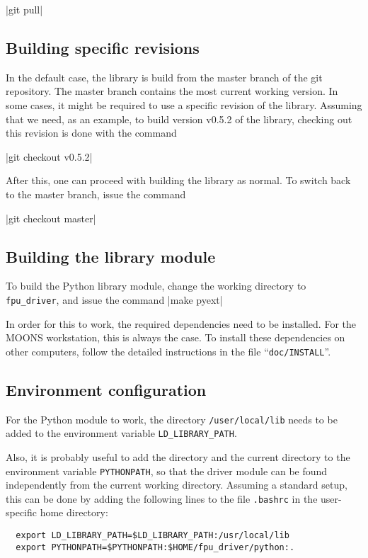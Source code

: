 \documentclass{scrartcl}[12pt,a4paper]
\begin{document}
|git pull|


\subsection{Building specific revisions}
In the default case, the library is build from
the master branch of the git repository.
The master branch contains the most current
working version.
In some cases, it might be required to
use a specific revision of the library.
Assuming that we need, as an example,
to build version v0.5.2 of the library,
checking out this revision is done with the
command

|git checkout v0.5.2|

After this, one can proceed with building the library as normal. To
switch back to the master branch, issue the command

|git checkout master|


\subsection{Building the library module}

To build the Python library module,
change the working directory to \texttt{fpu\_driver},
and issue the command |make pyext|

In order for this to work, the required dependencies need to be
installed. For the MOONS workstation, this is always the case. To
install these dependencies on other computers, follow the detailed
instructions in the file ``\texttt{doc/INSTALL}''.

\subsection{Environment configuration}

For the Python module to work, the directory \texttt{/user/local/lib}
needs to be added to the environment variable
\texttt{LD\_LIBRARY\_PATH}.

Also, it is probably useful to add the  directory and
the current directory to the environment variable \texttt{PYTHONPATH},
so that the driver module can be found independently from the current
working directory.  Assuming a standard setup, this can be done by
adding the following lines to the file \texttt{.bashrc} in the
user-specific home directory:

\begin{verbatim}
  export LD_LIBRARY_PATH=$LD_LIBRARY_PATH:/usr/local/lib
  export PYTHONPATH=$PYTHONPATH:$HOME/fpu_driver/python:.
\end{verbatim}
\end{document}
